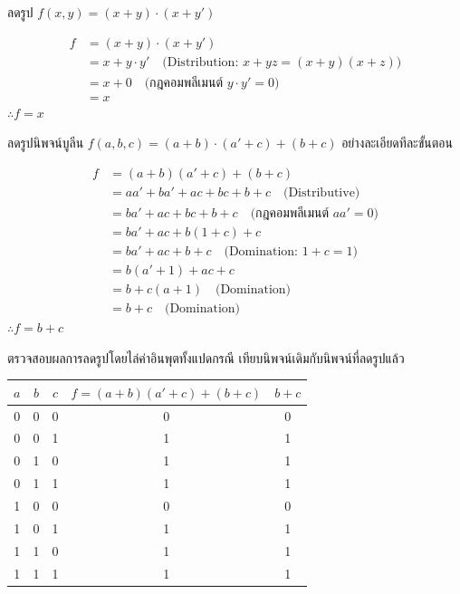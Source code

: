 \begin{ex}
\label{ex:simplify-pos-form}
ลดรูป $f(x, y) = (x + y) \cdot (x + y')$
\end{ex}
\begin{solution}
\begin{align*}
f &= (x + y) \cdot (x + y') \\
  &= x + y \cdot y' \quad \text{(Distribution: } x + yz = (x+y)(x+z)) \\
  &= x + 0 \quad \text{(กฎคอมพลีเมนต์ } y \cdot y' = 0) \\
  &= x
\end{align*}
$\therefore f = x$ \solhere
\end{solution}

\begin{ex}
\label{ex:simplify-stepwise}
ลดรูปนิพจน์บูลีน $f(a, b, c) = (a + b) \cdot (a' + c) + (b + c)$ อย่างละเอียดทีละขั้นตอน
\end{ex}

\begin{solution}
\begin{align*}
f &= (a + b)(a' + c) + (b + c) \\
  &= a a' + b a' + a c + b c + b + c \quad \text{(Distributive)} \\
  &= b a' + a c + b c + b + c \quad \text{(กฎคอมพลีเมนต์ } a a' = 0) \\
  &= b a' + a c + b(1 + c) + c \\
  &= b a' + a c + b + c \quad \text{(Domination: } 1 + c = 1) \\
  &= b(a' + 1) + a c + c \\
  &= b + c(a + 1) \quad \text{(Domination)} \\
  &= b + c \quad \text{(Domination)}
\end{align*}
$\therefore f = b + c$ \solhere
\end{solution}

ตรวจสอบผลการลดรูปโดยไล่ค่าอินพุตทั้งแปดกรณี เทียบนิพจน์เดิมกับนิพจน์ที่ลดรูปแล้ว
\begin{center}
\begin{tabular}{|c|c|c|c|c|}
\hline
$a$ & $b$ & $c$ & $f = (a+b)(a'+c) + (b+c)$ & $b + c$ \\
\hline
0 & 0 & 0 & 0 & 0 \\
\hline
0 & 0 & 1 & 1 & 1 \\
\hline
0 & 1 & 0 & 1 & 1 \\
\hline
0 & 1 & 1 & 1 & 1 \\
\hline
1 & 0 & 0 & 0 & 0 \\
\hline
1 & 0 & 1 & 1 & 1 \\
\hline
1 & 1 & 0 & 1 & 1 \\
\hline
1 & 1 & 1 & 1 & 1 \\
\hline
\end{tabular}
\end{center}

